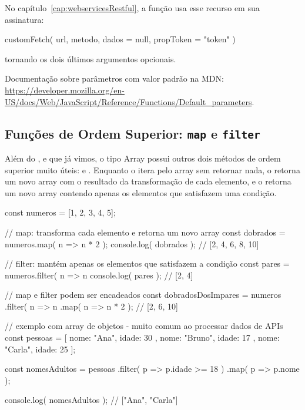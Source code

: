 No capítulo~\ref{cap:webservicesRestful}, a função  usa esse recurso em sua assinatura:

\begin{boxJavaScriptCode}
customFetch( url, metodo, dados = null, propToken = "token" )
\end{boxJavaScriptCode}

tornando os dois últimos argumentos opcionais.

\begin{saibaMais}
    Documentação sobre parâmetros com valor padrão na MDN: \url{https://developer.mozilla.org/en-US/docs/Web/JavaScript/Reference/Functions/Default_parameters}.
\end{saibaMais}


\subsection{Funções de Ordem Superior: \texttt{map} e \texttt{filter}}

Além do ,  e  que já vimos, o tipo Array possui outros dois métodos de ordem superior muito úteis:  e . Enquanto o  itera pelo array sem retornar nada, o  retorna um novo array com o resultado da transformação de cada elemento, e o  retorna um novo array contendo apenas os elementos que satisfazem uma condição.

\begin{boxJavaScriptCode}[title=map e filter]
const numeros = [1, 2, 3, 4, 5];

// map: transforma cada elemento e retorna um novo array
const dobrados = numeros.map( n => n * 2 );
console.log( dobrados ); // [2, 4, 6, 8, 10]

// filter: mantém apenas os elementos que satisfazem a condição
const pares = numeros.filter( n => n %
console.log( pares ); // [2, 4]

// map e filter podem ser encadeados
const dobradosDosImpares = numeros
    .filter( n => n %
    .map( n => n * 2 );           // [2, 6, 10]

// exemplo com array de objetos - muito comum ao processar dados de APIs
const pessoas = [
    { nome: "Ana",   idade: 30 },
    { nome: "Bruno", idade: 17 },
    { nome: "Carla", idade: 25 }
];

const nomesAdultos = pessoas
    .filter( p => p.idade >= 18 )
    .map( p => p.nome );

console.log( nomesAdultos ); // ["Ana", "Carla"]
\end{boxJavaScriptCode}

